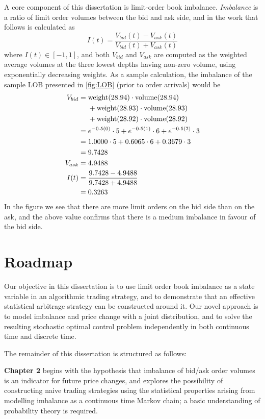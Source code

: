 A core component of this dissertation is limit-order book imbalance. \emph{Imbalance} is a ratio of limit order volumes between the bid and ask side, and in the work that follows is calculated as 
\begin{equation}\label{eq:LOBImbalance}
I(t) = \dfrac{V_{bid}(t) - V_{ask}(t)}{V_{bid}(t) + V_{ask}(t)}
\end{equation}
where $I(t) \in [-1,1]$, and both $V_{bid}$ and $V_{ask}$ are computed as the weighted average volumes at the three lowest depths having non-zero volume, using exponentially decreasing weights. As a sample calculation, the imbalance of the sample LOB presented in \autoref{fig:LOB} (prior to order arrivals) would be
\begin{align*}
V_{bid} & = \text{weight}(28.94)\cdot\text{volume}(28.94) \\
& \hphantom{{}={}} + \text{weight}(28.93)\cdot\text{volume}(28.93) \\
& \hphantom{{}={}} + \text{weight}(28.92)\cdot\text{volume}(28.92) \\
& = e^{-0.5 (0)} \cdot 5 + e^{-0.5 (1)} \cdot 6 + e^{-0.5 (2)} \cdot 3\\
& = 1.0000 \cdot 5 + 0.6065 \cdot 6 + 0.3679 \cdot 3 \\
& = 9.7428 \\
V_{ask} & = 4.9488 \\
I(t) & = \dfrac{9.7428 - 4.9488}{9.7428 + 4.9488} \\
&  = 0.3263
\end{align*}
In the figure we see that there are more limit orders on the bid side than on the ask, and the above value confirms that there is a medium imbalance in favour of the bid side.

\section{Roadmap}

Our objective in this dissertation is to use limit order book imbalance as a state variable in an algorithmic trading strategy, and to demonstrate that an effective statistical arbitrage strategy can be constructed around it. Our novel approach is to model imbalance and price change with a joint distribution, and to solve the resulting stochastic optimal control problem independently in both continuous time and discrete time.

The remainder of this dissertation is structured as follows:

{\bf Chapter 2} begins with the hypothesis that imbalance of bid/ask order volumes is an indicator for future price changes, and explores the possibility of constructing naive trading strategies using the statistical properties arising from modelling imbalance as a continuous time Markov chain; a basic understanding of probability theory is required. 

